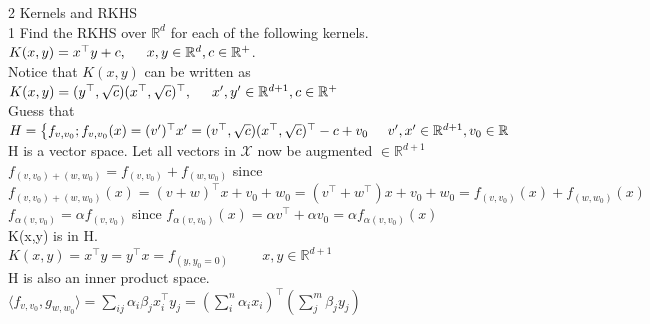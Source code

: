 \documentclass[18pt]{article}
\author{Adam Handwerger}
\begin{document}
\begin{flushleft}
2 Kernels and RKHS\\
\vspace{.4cm}
1 Find the RKHS over $\mathbb{R}^d$ for each of the following kernels.\\
\vspace{.4cm}
$K(x,y)=x^{\top}y+c,\hspace{.5cm} x,y\in\mathbb{R}^d, c\in \mathbb{R}^{+}$.\\
\vspace{.4cm}
Notice that $K(x,y)$ can be written as\\
\vspace{.4cm}
$K(x,y)=(y^{\top},\sqrt{c})(x^{\top},\sqrt{c})^{\top},\hspace{.5cm} x^{\prime},y^{\prime} \in \mathbb{R}^{d+1}, c\in \mathbb{R}^{+}$\\
\vspace{.4cm}
Guess that\\
\vspace{.4cm}
$H=\left\{f_{v,v_0}; f_{v,v_0}(x)=(v^{\prime})^{\top} x^{\prime}=(v^{\top},\sqrt{c})(x^{\top},\sqrt{c})^{\top}-c+v_0 \hspace{.5cm} v^{\prime},x^{\prime}\in \mathbb{R}^{d+1},v_0 \in \mathbb{R} \right.$\\
\vspace{.4cm}
H is a vector space. Let all vectors in $\mathcal{X}$ now be augmented $\in \mathbb{R}^{d+1}$\\
\vspace{.4cm}
$f_{(v,v_0)+(w,w_0)}=f_{(v,v_0)}+f_{(w,w_0)}$ since $f_{(v,v_0)+(w,w_0)}(x)=(v+w)^{\top}x+v_0+w_0=(v^{\top}+w^{\top})x+v_0+w_0=f_{(v,v_0)}(x)+f_{(w,w_0)}(x)$\\
$f_{\alpha(v,v_0)}=\alpha f_{(v,v_0)}$ since $f_{\alpha(v,v_0)}(x)=\alpha v^{\top}+ \alpha v_0=\alpha f_{\alpha(v,v_0)}(x)$\\
\vspace{.4cm}
K(x,y) is in H.\\
\vspace{.4cm}
$K(x,y)=x^{\top}y=y^{\top}x=f_{(y,y_0=0)}\hspace{1cm} x,y \in \mathbb{R}^{d+1}$\\
\vspace{.4cm}
H is also an inner product space.\\
\vspace{.4cm}
$\langle f_{v,v_0},g_{w,w_0}\rangle=\sum\limits_{ij}\alpha_i\beta_j x_{i}^{\top}y_j=\left(\sum\limits_{i}^{n} \alpha_i x_i\right)^{\top}\left(\sum\limits_{j}^{m} \beta_j y_j\right)$\\

\end{flushleft}
\end{document}
